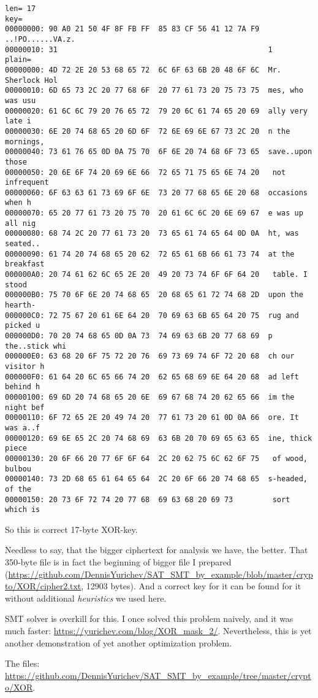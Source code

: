 \begin{lstlisting}
len= 17
key=
00000000: 90 A0 21 50 4F 8F FB FF  85 83 CF 56 41 12 7A F9  ..!PO......VA.z.
00000010: 31                                                1
plain=
00000000: 4D 72 2E 20 53 68 65 72  6C 6F 63 6B 20 48 6F 6C  Mr. Sherlock Hol
00000010: 6D 65 73 2C 20 77 68 6F  20 77 61 73 20 75 73 75  mes, who was usu
00000020: 61 6C 6C 79 20 76 65 72  79 20 6C 61 74 65 20 69  ally very late i
00000030: 6E 20 74 68 65 20 6D 6F  72 6E 69 6E 67 73 2C 20  n the mornings,
00000040: 73 61 76 65 0D 0A 75 70  6F 6E 20 74 68 6F 73 65  save..upon those
00000050: 20 6E 6F 74 20 69 6E 66  72 65 71 75 65 6E 74 20   not infrequent
00000060: 6F 63 63 61 73 69 6F 6E  73 20 77 68 65 6E 20 68  occasions when h
00000070: 65 20 77 61 73 20 75 70  20 61 6C 6C 20 6E 69 67  e was up all nig
00000080: 68 74 2C 20 77 61 73 20  73 65 61 74 65 64 0D 0A  ht, was seated..
00000090: 61 74 20 74 68 65 20 62  72 65 61 6B 66 61 73 74  at the breakfast
000000A0: 20 74 61 62 6C 65 2E 20  49 20 73 74 6F 6F 64 20   table. I stood
000000B0: 75 70 6F 6E 20 74 68 65  20 68 65 61 72 74 68 2D  upon the hearth-
000000C0: 72 75 67 20 61 6E 64 20  70 69 63 6B 65 64 20 75  rug and picked u
000000D0: 70 20 74 68 65 0D 0A 73  74 69 63 6B 20 77 68 69  p the..stick whi
000000E0: 63 68 20 6F 75 72 20 76  69 73 69 74 6F 72 20 68  ch our visitor h
000000F0: 61 64 20 6C 65 66 74 20  62 65 68 69 6E 64 20 68  ad left behind h
00000100: 69 6D 20 74 68 65 20 6E  69 67 68 74 20 62 65 66  im the night bef
00000110: 6F 72 65 2E 20 49 74 20  77 61 73 20 61 0D 0A 66  ore. It was a..f
00000120: 69 6E 65 2C 20 74 68 69  63 6B 20 70 69 65 63 65  ine, thick piece
00000130: 20 6F 66 20 77 6F 6F 64  2C 20 62 75 6C 62 6F 75   of wood, bulbou
00000140: 73 2D 68 65 61 64 65 64  2C 20 6F 66 20 74 68 65  s-headed, of the
00000150: 20 73 6F 72 74 20 77 68  69 63 68 20 69 73         sort which is
\end{lstlisting}

So this is correct 17-byte XOR-key.

Needless to say, that the bigger ciphertext for analysis we have, the better.
That 350-byte file is in fact the beginning of bigger file I prepared
(\url{https://github.com/DennisYurichev/SAT_SMT_by_example/blob/master/crypto/XOR/cipher2.txt}, 12903 bytes).
And a correct key for it can be found for it without additional \emph{heuristics} we used here.

SMT solver is overkill for this. I once solved this problem naively, and it was much faster:
\url{https://yurichev.com/blog/XOR_mask_2/}.
Nevertheless, this is yet another demonstration of yet another optimization problem.

The files: \url{https://github.com/DennisYurichev/SAT_SMT_by_example/tree/master/crypto/XOR}.

